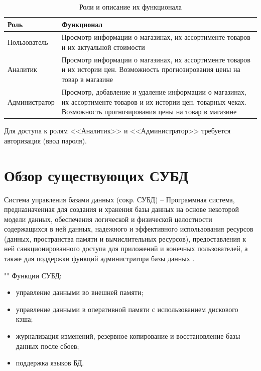\documentclass[a4paper,14pt]{extreport}
\begin{document}
\begin{table}[H]
	\caption{Роли и описание их функционала}
	\begin{center}
		\begin{tabular}{| l | p{12 cm} |} 
			\hline
			
			\textbf{Роль} & \textbf{Функционал} \\  
			
			\hline
			
			Пользователь & Просмотр информации о магазинах, их ассортименте товаров и их актуальной стоимости \\
			
			\hline
			
			Аналитик & Просмотр информации о магазинах, их ассортименте товаров и их истории цен. Возможность прогнозирования цены на товар в магазине \\
			
			\hline
			
			Администратор & Просмотр, добавление и удаление информации о магазинах, их ассортименте товаров и их истории цен, товарных чеках. Возможность прогнозирования цены на товар в магазине \\
			
			\hline
		\end{tabular}
	\end{center}
\end{table}

Для доступа к ролям <<Аналитик>> и <<Администратор>> требуется авторизация (ввод пароля).

\section{Обзор существующих СУБД}

Система управления базами данных (сокр. СУБД) -- Программная система, предназначенная для создания и хранения базы данных на основе некоторой модели данных, обеспечения логической и физической целостности содержащихся в ней данных, надежного и эффективного использования ресурсов (данных, пространства памяти и вычислительных ресурсов), предоставления к ней санкционированного доступа для приложений и конечных пользователей, а также для поддержки 
функций администратора базы данных \cite{kogal}.

""\newline
Функции СУБД:

\begin{itemize}
	\setlength\itemsep{0.01em}
	\item управление данными во внешней памяти;
	\item управление данными в оперативной памяти с использованием дискового кэша;
	\item журнализация изменений, резервное копирование и восстановление базы данных после сбоев;
	\item поддержка языков БД.
\end{itemize}
\end{document}
